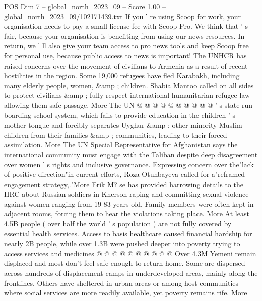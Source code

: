 \begin{textsample}{POS Dim 7 – global\_north\_2023\_09 – Score 1.00 – global\_north\_2023\_09/102171439.txt}
If you ' re using Scoop for work, your organisation needs to pay a small license fee with Scoop Pro.
We think that ' s fair, because your organisation is benefiting from using our news resources.
In return, we ' ll also give your team access to pro news tools and keep Scoop free for personal use, because public access to news is important!
The UNHCR has raised concerns over the movement of civilians to Armenia as a result of recent hostilities in the region.
Some 19,000 refugees have fled Karabakh, including many elderly people, women, \&amp ; children.
Shabia Mantoo called on all sides to protect civilians \&amp ; fully respect international humanitarian refugee law allowing them safe passage.
More The UN @ @ @ @ @ @ @ @ @ @ ' s state-run boarding school system, which fails to provide education in the children ' s mother tongue and forcibly separates Uyghur \&amp ; other minority Muslim children from their families \&amp ; communities, leading to their forced assimilation.
More The UN Special Representative for Afghanistan says the international community must engage with the Taliban despite deep disagreement over women ' s rights and inclusive governance.
Expressing concern over the"lack of positive direction"in current efforts, Roza Otunbayeva called for a"reframed engagement strategy,."More Erik M? se has provided harrowing details to the HRC about Russian soldiers in Kherson raping and committing sexual violence against women ranging from 19-83 years old.
Family members were often kept in adjacent rooms, forcing them to hear the violations taking place.
More At least 4.5B people ( over half the world ' s population ) are not fully covered by essential health services.
Access to basis healthcare caused financial hardship for nearly 2B people, while over 1.3B were pushed deeper into poverty trying to access services and medicines @ @ @ @ @ @ @ @ @ @ Over 4.3M Yemeni remain displaced and most don't feel safe enough to return home.
Some are dispersed across hundreds of displacement camps in underdeveloped areas, mainly along the frontlines.
Others have sheltered in urban areas or among host communities where social services are more readily available, yet poverty remains rife.
More

\end{textsample}
